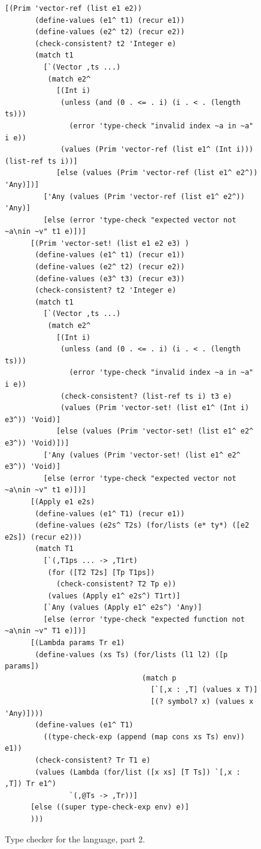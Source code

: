 \documentclass[7x10]{TimesAPriori_MIT}%
\numberwithin{theorem}{chapter}
\numberwithin{definition}{chapter}
\numberwithin{equation}{chapter}
\begin{document}
{\begin{figure}[tbp]
\begin{tcolorbox}[colback=white]  
\begin{lstlisting}[basicstyle=\ttfamily\footnotesize]
      [(Prim 'vector-ref (list e1 e2))
       (define-values (e1^ t1) (recur e1))
       (define-values (e2^ t2) (recur e2))
       (check-consistent? t2 'Integer e)
       (match t1
         [`(Vector ,ts ...)
          (match e2^
            [(Int i)
             (unless (and (0 . <= . i) (i . < . (length ts)))
               (error 'type-check "invalid index ~a in ~a" i e))
             (values (Prim 'vector-ref (list e1^ (Int i))) (list-ref ts i))]
            [else (values (Prim 'vector-ref (list e1^ e2^)) 'Any)])]
         ['Any (values (Prim 'vector-ref (list e1^ e2^)) 'Any)]
         [else (error 'type-check "expected vector not ~a\nin ~v" t1 e)])]
      [(Prim 'vector-set! (list e1 e2 e3) )
       (define-values (e1^ t1) (recur e1))
       (define-values (e2^ t2) (recur e2))
       (define-values (e3^ t3) (recur e3))
       (check-consistent? t2 'Integer e)
       (match t1
         [`(Vector ,ts ...)
          (match e2^
            [(Int i)
             (unless (and (0 . <= . i) (i . < . (length ts)))
               (error 'type-check "invalid index ~a in ~a" i e))
             (check-consistent? (list-ref ts i) t3 e)
             (values (Prim 'vector-set! (list e1^ (Int i) e3^)) 'Void)]
            [else (values (Prim 'vector-set! (list e1^ e2^ e3^)) 'Void)])]
         ['Any (values (Prim 'vector-set! (list e1^ e2^ e3^)) 'Void)]
         [else (error 'type-check "expected vector not ~a\nin ~v" t1 e)])]
      [(Apply e1 e2s)
       (define-values (e1^ T1) (recur e1))
       (define-values (e2s^ T2s) (for/lists (e* ty*) ([e2 e2s]) (recur e2)))
       (match T1
         [`(,T1ps ... -> ,T1rt)
          (for ([T2 T2s] [Tp T1ps])
            (check-consistent? T2 Tp e))
          (values (Apply e1^ e2s^) T1rt)]
         [`Any (values (Apply e1^ e2s^) 'Any)]
         [else (error 'type-check "expected function not ~a\nin ~v" T1 e)])]
      [(Lambda params Tr e1)
       (define-values (xs Ts) (for/lists (l1 l2) ([p params])
                                (match p
                                  [`[,x : ,T] (values x T)]
                                  [(? symbol? x) (values x 'Any)])))
       (define-values (e1^ T1) 
         ((type-check-exp (append (map cons xs Ts) env)) e1))
       (check-consistent? Tr T1 e)
       (values (Lambda (for/list ([x xs] [T Ts]) `[,x : ,T]) Tr e1^)
               `(,@Ts -> ,Tr))]
      [else ((super type-check-exp env) e)]
      )))
\end{lstlisting}
\end{tcolorbox}
\caption{Type checker for the \LangGrad{} language, part 2.}
\label{fig:type-check-Lgradual-2}
\end{figure}

}
\end{document}
